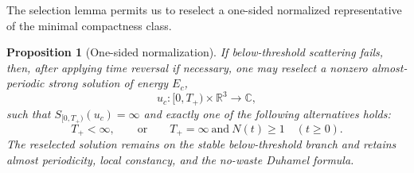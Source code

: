 \documentclass{interact}
\numberwithin{equation}{section}
\theoremstyle{plain}
\newtheorem{proposition}[theorem]{Proposition}
\theoremstyle{definition}
\theoremstyle{remark}
\newcommand{\R}{\mathbb R}
\newcommand{\C}{\mathbb C}
\begin{document}
The selection lemma permits us to reselect a one-sided normalized representative of the minimal compactness class.

\begin{proposition}[One-sided normalization]\label{prop:one-sided-selection}
If below-threshold scattering fails, then, after applying time reversal if necessary, one may reselect a nonzero almost-periodic strong solution of energy $E_c$,
\[
 u_c:[0,T_+)\times\R^3\to\C,
\]
such that $S_{[0,T_+)}(u_c)=\infty$ and exactly one of the following alternatives holds:
\begin{equation}\label{eq:two-normalized-cases}
 T_+<\infty,
 \qquad\text{or}\qquad
 T_+=\infty\ \text{and}\ N(t)\ge1
 \quad(t\ge0).
\end{equation}
The reselected solution remains on the stable below-threshold branch and retains almost periodicity, local constancy, and the no-waste Duhamel formula.
\end{proposition}
\end{document}

